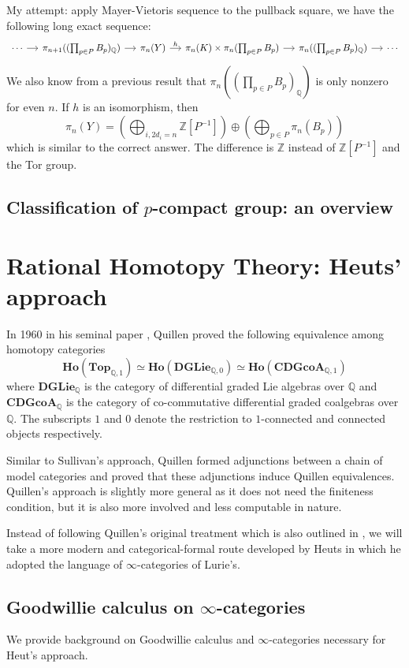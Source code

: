 \documentclass[psamsfonts]{amsart}
\theoremstyle{definition}
\theoremstyle{remark}
\newcommand{\Q}{\mathbb{Q}}
\newcommand{\Z}{\mathbb{Z}}
\newcommand{\CDGcoA}{\mathbf{CDGcoA}}
\newcommand{\DGLie}{\mathbf{DGLie}}
\newcommand{\Ho}{\mathbf{Ho}}
\newcommand{\Top}{\mathbf{Top}}
\numberwithin{equation}{section}
\begin{document}
\noindent My attempt: apply Mayer-Vietoris sequence to the pullback square, we have the following long exact sequence:
\[\begin{tikzcd}[column sep=small]
\cdots\arrow[r]&\pi_{n+1}((\prod_{p\in P}B_p)_\Q)\arrow[r]&\pi_n(Y)\arrow[r,"h"]&\pi_n(K)\times\pi_n(\prod_{p\in P}B_p)\arrow[r]&\pi_n((\prod_{p\in P}B_p)_\Q)\arrow[r]&\cdots
\end{tikzcd}\]
We also know from a previous result that $\pi_n((\prod_{p\in P}B_p)_\Q)$ is only nonzero for even $n$. If $h$ is an isomorphism, then
\[\textstyle{\pi_n(Y)=(\bigoplus_{i,2d_i=n}\Z[P^{-1}])\oplus(\bigoplus_{p\in P}\pi_n(B_p))}\]
which is similar to the correct answer. The difference is $\Z$ instead of $\Z[P^{-1}]$ and the Tor group.

\subsection{Classification of $p$-compact group: an overview}

\newpage
\section{Rational Homotopy Theory: Heuts' approach}

In 1960 in his seminal paper \cite{Quillen}, Quillen proved the following equivalence among homotopy categories
\[\Ho(\Top_{\Q,1})\simeq\Ho(\DGLie_{\Q,0})\simeq\Ho(\CDGcoA_{\Q,1})\]
where $\DGLie_\Q$ is the category of differential graded Lie algebras over $\Q$ and $\CDGcoA_\Q$ is the category of co-commutative differential graded coalgebras over $\Q$. The subscripts $1$ and $0$ denote the restriction to $1$-connected and connected objects respectively.

Similar to Sullivan's approach, Quillen formed adjunctions between a chain of model categories and proved that these adjunctions induce Quillen equivalences. Quillen's approach is slightly more general as it does not need the finiteness condition, but it is also more involved and less computable in nature.

Instead of following Quillen's original treatment which is also outlined in \cite{Murillo}, we will take a more modern and categorical-formal route developed by Heuts \cite{Heuts} in which he adopted the language of $\infty$-categories of Lurie's.

\subsection{Goodwillie calculus on $\infty$-categories}
We provide background on Goodwillie calculus and $\infty$-categories necessary for Heut's approach.\medbreak
\end{document}
